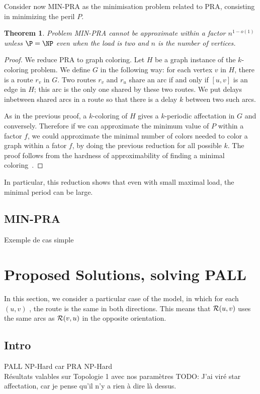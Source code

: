 \documentclass[a4paper,10pt]{article}
\newtheorem{theorem}{Theorem}
\newcommand{\todo}[1]{{\color{red} TODO: {#1}}}
\begin{document}
Consider now MIN-PRA as the minimisation problem related to PRA, consisting in minimizing the peril $P$.

\begin{theorem}
 Problem MIN-PRA cannot be approximate within a factor $n^{1-o(1)}$ unless $\P = \NP$ even when the load is two
 and $n$ is the number of vertices.
\end{theorem}

\begin{proof}
 We reduce PRA to graph coloring. Let $H$ be a graph instance of the $k$-coloring problem. 
 We define $G$ in the following way: for each vertex $v$ in $H$, there is a route $r_v$ in $G$.
 Two routes $r_v$ and $r_u$ share an arc if and only if $[u,v]$ is an edge in $H$; this arc is the only one shared by these two routes.   We put delays inbetween shared arcs in a route so that there is a delay $k$ between two such arcs. 
 
 As in the previous proof, a $k$-coloring of $H$ gives a $k$-periodic affectation in $G$
 and conversely. Therefore if we can approximate the minimum value of $P$  within a factor $f$,
 we could approximate the minimal number of colors needed to color a graph within a fator $f$, 
 by doing the previous reduction for all possible $k$. The proof follows from the hardness of approximability
 of finding a minimal coloring~\cite{zuckerman2006linear}.
\end{proof}


In particular, this reduction shows that even with small maximal load, the 
minimal period can be large.
   
  \subsection{MIN-PRA}
    Exemple de cas simple
    
\section{Proposed Solutions, solving PALL}
  
  In this section, we consider a particular case of the model, in which for each $(u,v)$ , the route is the same in both directions. This means that ${\cal R}(u,v)$ uses the same arcs as ${\cal R}(v,u)$ in the opposite orientation.
  \subsection{Intro}
    PALL NP-Hard car PRA NP-Hard\\
    Résultats valables sur Topologie 1 avec nos paramètres
    \todo{J'ai viré star affectation, car je pense qu'il n'y a rien à dire là dessus.}
    
\end{document}
